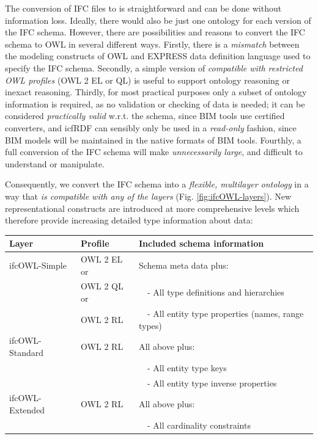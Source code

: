 The conversion of IFC files to \ifcrdf{} is straightforward and can be done 
without information loss.
Ideally, there would also be just one \ifcowl{} ontology for each version of the IFC schema. However,
there are possibilities and reasons to convert the IFC schema to OWL in several different ways. Firstly, there is a \emph{mismatch} between the modeling constructs of OWL and 
EXPRESS data definition language used to specify the IFC schema. Secondly, a simple version of \ifcowl{} \emph{compatible with
restricted OWL profiles} (OWL 2 EL or QL) \cite{motik2009owl} is useful to support ontology
reasoning or inexact reasoning. Thirdly, for most practical purposes only a subset of ontology
information is required, as no validation or checking of \ifcrdf{} data is needed; it can
be considered \emph{practically valid} w.r.t. the schema, since BIM tools use certified converters, and icfRDF can sensibly only be used in a
\emph{read-only} fashion, since BIM models will be maintained in the native formats of BIM
tools. Fourthly, a full conversion of the IFC schema will make \ifcowl{}
\emph{unnecessarily large}, and difficult to understand or manipulate.

Consequently, we convert the IFC schema into a \emph{flexible, multilayer \ifcowl{} ontology}
in a way that \emph{\ifcrdf{} is compatible with any of the layers} (Fig. \ref{fig:ifcOWL-layers}). 
New representational constructs are introduced at more comprehensive levels which therefore 
provide increasing detailed type information about \ifcrdf{} data: 

\vspace{0.5\topsep}
\noindent
\begin{scriptsize}
\begin{center}
    \def\arraystretch{1.2}
    \setlength{\tabcolsep}{6pt}
    \begin{tabularx}{0.95\textwidth}{|l|l|X|}
        \hline
            \textbf{Layer} & \textbf{Profile} & \textbf{Included schema information} \\
        \hline
            ifcOWL-Simple & OWL 2 EL or & Schema meta data plus: \\
            & OWL 2 QL or & \ \ - All type definitions and hierarchies \\
            & OWL 2 RL & \ \ - All entity type properties (names, range types) \\
        \hline 
            ifcOWL-Standard & OWL 2 RL & All above plus: \\
            & & \ \ - All entity type keys \\
            & & \ \ - All entity type inverse properties \\
        \hline
            ifcOWL-Extended & OWL 2 RL & All above plus: \\
            & & \ \ - All cardinality constraints \\
        \hline
    \end{tabularx}
\end{center}
\end{scriptsize}

